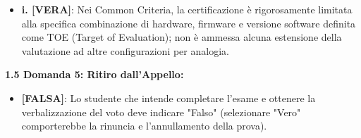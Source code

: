\documentclass[11pt,a4paper]{article}
\begin{document}
\begin{solutionbox}
\begin{itemize}
    \item \textbf{i. [VERA]}: Nei Common Criteria, la certificazione è rigorosamente limitata alla specifica combinazione di hardware, firmware e versione software definita come TOE (Target of Evaluation); non è ammessa alcuna estensione della valutazione ad altre configurazioni per analogia.
\end{itemize}

\textbf{1.5 Domanda 5: Ritiro dall'Appello:}
\begin{itemize}
    \item \textbf{[FALSA]}: Lo studente che intende completare l'esame e ottenere la verbalizzazione del voto deve indicare "Falso" (selezionare "Vero" comporterebbe la rinuncia e l'annullamento della prova).
\end{itemize}


\end{solutionbox}
\end{document}
